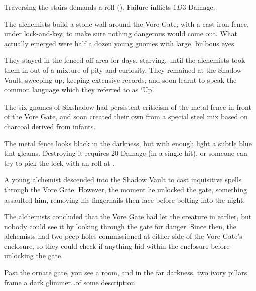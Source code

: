 \begin{multicols}{2}
Traversing the stairs demands a  roll (\tn[8]).
Failure inflicts $1D3$ Damage.



\begin{exampletext}
  The alchemists build a stone wall around the Vore Gate, with a cast-iron fence, under lock-and-key, to make sure nothing dangerous would come out.
  What actually emerged were half a dozen young gnomes with large, bulbous eyes.

  They stayed in the fenced-off area for days, starving, until the alchemists took them in out of a mixture of pity and curiosity.
  They remained at the Shadow Vault, sweeping up, keeping extensive records, and soon learnt to speak the common language which they referred to as `Up'.

  The six gnomes of Sixshadow had persistent criticism of the metal fence in front of the Vore Gate, and soon created their own from a special steel mix based on charcoal derived from  infants.
\end{exampletext}

The metal fence looks black in the darkness, but with enough light a subtle blue tint gleams.
Destroying it requires 20 Damage (in a single hit), or someone can try to pick the lock with an  roll at \tn[16].

\shadowVaultMap


\begin{exampletext}
  A young alchemist descended into the Shadow Vault to cast inquisitive spells through the Vore Gate.
  However, the moment he unlocked the gate, something assaulted him, removing his fingernails then face before bolting into the night.

  The alchemists concluded that the Vore Gate had let the creature in earlier, but nobody could see it by looking through the gate for danger.
  Since then, the alchemists had two peep-holes commissioned at either side of the Vore Gate's enclosure, so they could check if anything hid within the enclosure before unlocking the gate.
\end{exampletext}

\begin{boxtext}
  Past the ornate gate, you see a room, and in the far darkness, two ivory pillars frame a dark glimmer\ldots of some description.
\end{boxtext}


\end{multicols}
